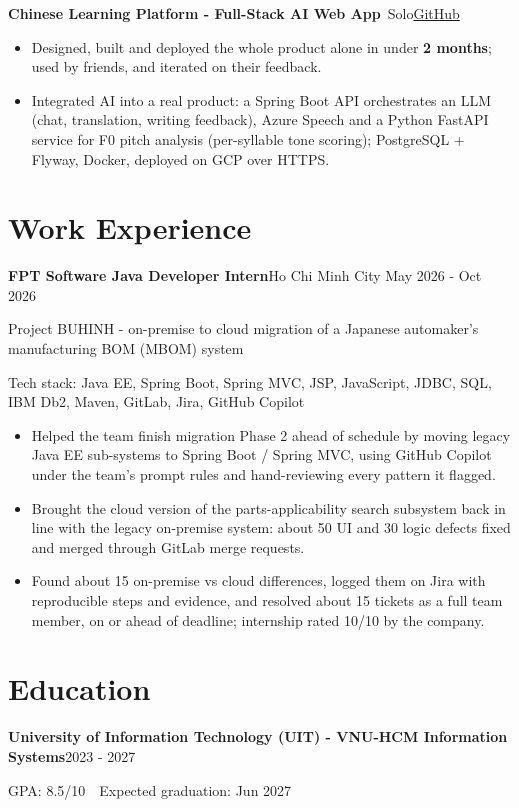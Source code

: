 \documentclass[10pt, a4paper]{article}
\newcommand{\entry}[2]{\textbf{#1}\hfill#2\par}
\newcommand{\subentry}[2]{{\color{MutedText}#1}\hfill{\color{MutedText}#2}\par}
\newcommand{\project}[3]{\textbf{#1}\,{\color{MutedText}\textbar{} #2}\hfill\href{#3}{GitHub}\par}
\newcommand{\techstack}[1]{{\color{MutedText}Tech stack: #1}\par}
\begin{document}
\vspace{2pt}
\project{Chinese Learning Platform - Full-Stack AI Web App}{Solo}{https://github.com/minhphuong150505/Web_Chinese_Learning-}
\begin{itemize}
  \item Designed, built and deployed the whole product alone in under \textbf{2 months}; used by friends, and iterated on their feedback.
  \item Integrated AI into a real product: a Spring Boot API orchestrates an LLM (chat, translation, writing feedback), Azure Speech and a Python FastAPI service for F0 pitch analysis (per-syllable tone scoring); PostgreSQL + Flyway, Docker, deployed on GCP over HTTPS.
\end{itemize}

\section{Work Experience}
\entry{FPT Software \textbar{} Java Developer Intern}{Ho Chi Minh City \textbar{} May 2026 - Oct 2026}
\subentry{Project BUHINH - on-premise to cloud migration of a Japanese automaker's manufacturing BOM (MBOM) system}{}
\techstack{Java EE, Spring Boot, Spring MVC, JSP, JavaScript, JDBC, SQL, IBM Db2, Maven, GitLab, Jira, GitHub Copilot}
\begin{itemize}
  \item Helped the team finish migration Phase 2 ahead of schedule by moving legacy Java EE sub-systems to Spring Boot / Spring MVC, using GitHub Copilot under the team's prompt rules and hand-reviewing every pattern it flagged.
  \item Brought the cloud version of the parts-applicability search subsystem back in line with the legacy on-premise system: about 50 UI and 30 logic defects fixed and merged through GitLab merge requests.
  \item Found about 15 on-premise vs cloud differences, logged them on Jira with reproducible steps and evidence, and resolved about 15 tickets as a full team member, on or ahead of deadline; internship rated 10/10 by the company.
\end{itemize}

\section{Education}
\entry{University of Information Technology (UIT) - VNU-HCM \textbar{} Information Systems}{2023 - 2027}
GPA: 8.5/10 \,\textbar\, Expected graduation: Jun 2027\par
\end{document}
